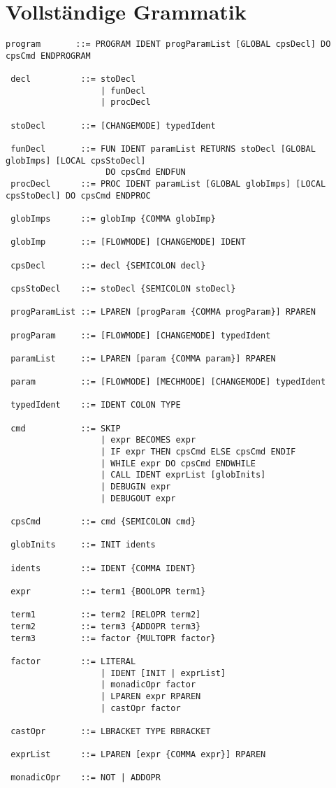 \documentclass[10pt, a4paper, twocolumn]{article} %
\begin{document}
\clearpage
\appendix
\onecolumn
\section{Vollständige Grammatik}
\begin{lstlisting}[backgroundcolor = \color{lightgray},
xleftmargin = 0.05cm,
framexleftmargin = 0.05em]
 program       ::= PROGRAM IDENT progParamList [GLOBAL cpsDecl] DO cpsCmd ENDPROGRAM

 decl          ::= stoDecl
                   | funDecl
                   | procDecl

 stoDecl       ::= [CHANGEMODE] typedIdent

 funDecl       ::= FUN IDENT paramList RETURNS stoDecl [GLOBAL globImps] [LOCAL cpsStoDecl]
                    DO cpsCmd ENDFUN
 procDecl      ::= PROC IDENT paramList [GLOBAL globImps] [LOCAL cpsStoDecl] DO cpsCmd ENDPROC

 globImps      ::= globImp {COMMA globImp}

 globImp       ::= [FLOWMODE] [CHANGEMODE] IDENT

 cpsDecl       ::= decl {SEMICOLON decl}

 cpsStoDecl    ::= stoDecl {SEMICOLON stoDecl}

 progParamList ::= LPAREN [progParam {COMMA progParam}] RPAREN

 progParam     ::= [FLOWMODE] [CHANGEMODE] typedIdent

 paramList     ::= LPAREN [param {COMMA param}] RPAREN

 param         ::= [FLOWMODE] [MECHMODE] [CHANGEMODE] typedIdent

 typedIdent    ::= IDENT COLON TYPE

 cmd           ::= SKIP
                   | expr BECOMES expr
                   | IF expr THEN cpsCmd ELSE cpsCmd ENDIF
                   | WHILE expr DO cpsCmd ENDWHILE
                   | CALL IDENT exprList [globInits]
                   | DEBUGIN expr
                   | DEBUGOUT expr

 cpsCmd        ::= cmd {SEMICOLON cmd}

 globInits     ::= INIT idents

 idents        ::= IDENT {COMMA IDENT}

 expr          ::= term1 {BOOLOPR term1}

 term1         ::= term2 [RELOPR term2]
 term2         ::= term3 {ADDOPR term3}
 term3         ::= factor {MULTOPR factor}

 factor        ::= LITERAL
                   | IDENT [INIT | exprList]
                   | monadicOpr factor
                   | LPAREN expr RPAREN
                   | castOpr factor

 castOpr       ::= LBRACKET TYPE RBRACKET

 exprList      ::= LPAREN [expr {COMMA expr}] RPAREN

 monadicOpr    ::= NOT | ADDOPR
\end{lstlisting}
\end{document}
